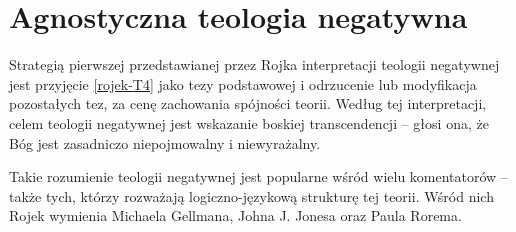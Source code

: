 

\section{Agnostyczna teologia negatywna}

Strategią pierwszej przedstawianej przez Rojka interpretacji teologii
negatywnej jest przyjęcie \eqref{rojek-T4} jako tezy podstawowej i odrzucenie lub
modyfikacja pozostałych tez, za cenę zachowania spójności teorii.
Według tej interpretacji, celem teologii negatywnej jest wskazanie
boskiej transcendencji -- głosi ona, że Bóg jest zasadniczo
niepojmowalny i niewyrażalny.

Takie rozumienie teologii negatywnej jest popularne wśród wielu
komentatorów -- także tych, którzy rozważają logiczno-językową strukturę
tej teorii. Wśród nich Rojek wymienia Michaela Gellmana, Johna J.
Jonesa oraz Paula Rorema.

